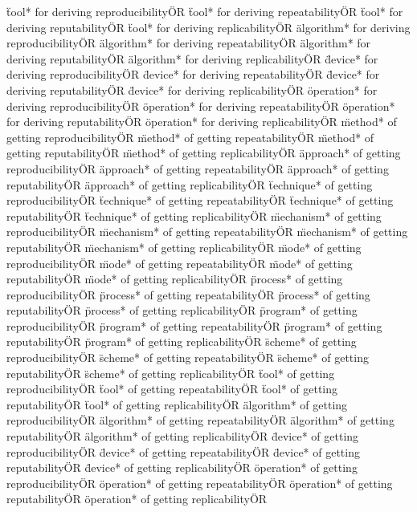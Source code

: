 \documentclass[
10pt, %
a4paper, %
oneside, %
headinclude,footinclude, %
BCOR5mm, %
]{scrartcl}
\begin{document}
\"tool* for deriving reproducibility\" OR \"tool* for deriving repeatability\" OR \"tool* for deriving reputability\" OR \"tool* for deriving replicability\" OR 
\"algorithm* for deriving reproducibility\" OR \"algorithm* for deriving repeatability\" OR \"algorithm* for deriving reputability\" OR \"algorithm* for deriving replicability\" OR 
\"device* for deriving reproducibility\" OR \"device* for deriving repeatability\" OR \"device* for deriving reputability\" OR \"device* for deriving replicability\" OR 
\"operation* for deriving reproducibility\" OR \"operation* for deriving repeatability\" OR \"operation* for deriving reputability\" OR \"operation* for deriving replicability\" OR 
\"method* of getting reproducibility\" OR \"method* of getting repeatability\" OR \"method* of getting reputability\" OR \"method* of getting replicability\" OR 
\"approach* of getting reproducibility\" OR \"approach* of getting repeatability\" OR \"approach* of getting reputability\" OR \"approach* of getting replicability\" OR 
\"technique* of getting reproducibility\" OR \"technique* of getting repeatability\" OR \"technique* of getting reputability\" OR \"technique* of getting replicability\" OR 
\"mechanism* of getting reproducibility\" OR \"mechanism* of getting repeatability\" OR \"mechanism* of getting reputability\" OR \"mechanism* of getting replicability\" OR 
\"mode* of getting reproducibility\" OR \"mode* of getting repeatability\" OR \"mode* of getting reputability\" OR \"mode* of getting replicability\" OR 
\"process* of getting reproducibility\" OR \"process* of getting repeatability\" OR \"process* of getting reputability\" OR \"process* of getting replicability\" OR 
\"program* of getting reproducibility\" OR \"program* of getting repeatability\" OR \"program* of getting reputability\" OR \"program* of getting replicability\" OR 
\"scheme* of getting reproducibility\" OR \"scheme* of getting repeatability\" OR \"scheme* of getting reputability\" OR \"scheme* of getting replicability\" OR 
\"tool* of getting reproducibility\" OR \"tool* of getting repeatability\" OR \"tool* of getting reputability\" OR \"tool* of getting replicability\" OR 
\"algorithm* of getting reproducibility\" OR \"algorithm* of getting repeatability\" OR \"algorithm* of getting reputability\" OR \"algorithm* of getting replicability\" OR 
\"device* of getting reproducibility\" OR \"device* of getting repeatability\" OR \"device* of getting reputability\" OR \"device* of getting replicability\" OR 
\"operation* of getting reproducibility\" OR \"operation* of getting repeatability\" OR \"operation* of getting reputability\" OR \"operation* of getting replicability\" OR 
\end{document}

